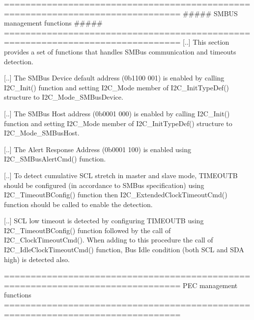 \begin{DoxyVerb} ===============================================================================
                      ##### SMBUS management functions #####
 ===============================================================================   
    [..] This section provides a set of functions that handles SMBus communication
         and timeouts detection.
    
    [..] The SMBus Device default address (0b1100 001) is enabled by calling I2C_Init()
         function and setting I2C_Mode member of I2C_InitTypeDef() structure to 
         I2C_Mode_SMBusDevice.
         
    [..] The SMBus Host address (0b0001 000) is enabled by calling I2C_Init()
         function and setting I2C_Mode member of I2C_InitTypeDef() structure to 
         I2C_Mode_SMBusHost.         
         
    [..] The Alert Response Address (0b0001 100) is enabled using I2C_SMBusAlertCmd()
         function.
         
    [..] To detect cumulative SCL stretch in master and slave mode, TIMEOUTB should be 
         configured (in accordance to SMBus specification) using I2C_TimeoutBConfig() 
         function then I2C_ExtendedClockTimeoutCmd() function should be called to enable
         the detection.
         
    [..] SCL low timeout is detected by configuring TIMEOUTB using I2C_TimeoutBConfig()
         function followed by the call of I2C_ClockTimeoutCmd(). When adding to this 
         procedure the call of I2C_IdleClockTimeoutCmd() function, Bus Idle condition 
         (both SCL and SDA high) is detected also.                \end{DoxyVerb}


\begin{DoxyVerb} ===============================================================================
                         PEC management functions
 ===============================================================================  \end{DoxyVerb}
 

